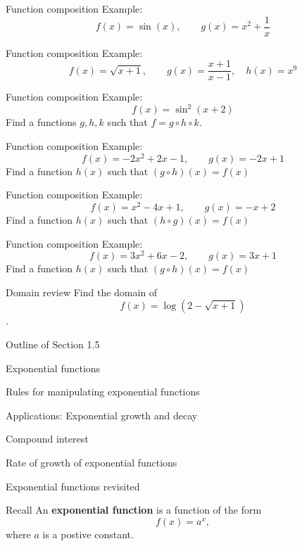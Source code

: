 \documentclass[t,handout]{beamer}
\newenvironment{fpi}
  {\itemize[nolistsep,itemsep=\fill]}
  {\vfill\enditemize}
\begin{document}
\begin{frame}{Function composition}
Example:
$$ f(x) = \sin(x), \qquad g(x) = x^2 + \frac{1}{x}$$
\end{frame}

\begin{frame}{Function composition}
Example:
$$ f(x) = \sqrt{x+1}, \qquad g(x) = \frac{x+1}{x-1},  \quad h(x) = x^{9}$$
\end{frame}


\begin{frame}{Function composition}
Example:
$$ f(x) = \sin^2(x +2)$$
Find a functions $g,h,k$ such that $f = g \circ h \circ k$.
\end{frame}

\begin{frame}{Function composition}
Example:
$$ f(x) = -2x^2 + 2x - 1, \qquad g(x) = -2x + 1$$
Find a function $h(x)$ such that $(g \circ h)(x) = f(x)$
\end{frame}

\begin{frame}{Function composition}
Example:
$$ f(x) = x^2 -4x + 1, \qquad g(x) = -x + 2$$
Find a function $h(x)$ such that $(h \circ g)(x) = f(x)$
\end{frame}

\begin{frame}{Function composition}
Example:
$$ f(x) = 3x^2 +6x -2, \qquad g(x) = 3x + 1$$
Find a function $h(x)$ such that $(g \circ h)(x) = f(x)$
\end{frame}


\begin{frame}{Domain review}
Find the domain of $$f(x) = \log(2 - \sqrt{x + 1})$$.
\end{frame}

\begin{frame}{Outline of Section 1.5}
\begin{fpi}
\item Exponential functions
\item Rules for manipulating exponential functions
\item Applications: Exponential growth and decay
\item Compound interest
\item Rate of growth of exponential functions
\end{fpi}
\end{frame}


\begin{frame}{Exponential functions revisited}
\begin{block}{Recall}
An \textbf{exponential function} is a function of the form
$$f(x) = a^x,$$
where $a$ is a postive constant.
\end{block}
\end{frame}
\end{document}
